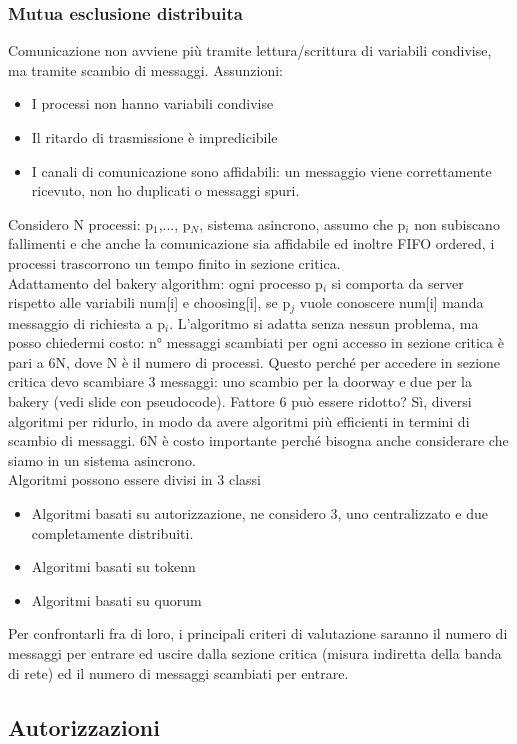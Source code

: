 \documentclass[16px]{article}
\begin{document}
\subsubsection{Mutua esclusione distribuita}
Comunicazione non avviene più tramite lettura/scrittura di variabili condivise, ma tramite scambio di messaggi. Assunzioni:
\begin{itemize}
\item I processi non hanno variabili condivise
\item Il ritardo di trasmissione è impredicibile
\item I canali di comunicazione sono affidabili: un messaggio viene correttamente ricevuto, non ho duplicati o messaggi spuri.
\end{itemize}
Considero N processi: p$_1$,..., p$_N$, sistema asincrono, assumo che p$_i$ non subiscano fallimenti e che anche la comunicazione sia affidabile ed inoltre FIFO ordered, i processi trascorrono un tempo finito in sezione critica.\\ Adattamento del bakery algorithm: ogni processo p$_i$ si comporta da server rispetto alle variabili num[i] e choosing[i], se p$_j$ vuole conoscere num[i] manda messaggio di richiesta a p$_i$. L'algoritmo si adatta senza nessun problema, ma posso chiedermi costo: n° messaggi scambiati per ogni accesso in sezione critica è  pari a 6N, dove N è il numero di processi. Questo perché per accedere in sezione critica devo scambiare 3 messaggi: uno scambio per la doorway e due per la bakery (vedi slide con pseudocode). Fattore 6 può essere ridotto? Sì, diversi algoritmi per ridurlo, in modo da avere algoritmi più efficienti in termini di scambio di messaggi. 6N è costo importante perché bisogna anche considerare che siamo in un sistema asincrono.\\ Algoritmi possono essere divisi in 3 classi
\begin{itemize}
\item Algoritmi basati su autorizzazione, ne considero 3, uno centralizzato e due completamente distribuiti.
\item Algoritmi basati su tokenn
\item Algoritmi basati su quorum
\end{itemize} Per confrontarli fra di loro, i principali criteri di valutazione saranno il numero di messaggi per entrare ed uscire dalla sezione critica (misura indiretta della banda di rete) ed il numero di messaggi scambiati per entrare.
\subsection{Autorizzazioni}
\end{document}
